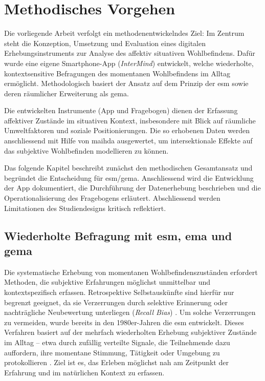 
\section{Methodisches Vorgehen} \label{sec:methodik}

Die vorliegende Arbeit verfolgt ein methodenentwickelndes Ziel: Im Zentrum steht die Konzeption, Umsetzung und Evaluation eines digitalen Erhebungsinstruments zur Analyse des affektiv situativen Wohlbefindens. Dafür wurde eine eigene Smartphone-App (\textit{InterMind}) entwickelt, welche wiederholte, kontextsensitive Befragungen des momentanen Wohlbefindens im Alltag ermöglicht. Methodologisch basiert der Ansatz auf dem Prinzip der \acrfull{esm} sowie deren räumlicher Erweiterung als \acrfull{gema}.

Die entwickelten Instrumente (App und Fragebogen) dienen der Erfassung affektiver Zustände im situativen Kontext, insbesondere mit Blick auf räumliche Umweltfaktoren und soziale Positionierungen. Die so erhobenen Daten werden anschliessend mit Hilfe von \acrfull{maihda} ausgewertet, um intersektionale Effekte auf das subjektive Wohlbefinden modellieren zu können.

Das folgende Kapitel beschreibt zunächst den methodischen Gesamtansatz und begründet die Entscheidung für \acrshort{esm}/\acrshort{gema}. Anschliessend wird die Entwicklung der App dokumentiert, die Durchführung der Datenerhebung beschrieben und die Operationalisierung des Fragebogens erläutert. Abschliessend werden Limitationen des Studiendesigns kritisch reflektiert.


\subsection{Wiederholte Befragung mit \acrshort{esm}, \acrshort{ema} und \acrshort{gema}}

Die systematische Erhebung von momentanen Wohlbefindenszuständen erfordert Methoden, die subjektive Erfahrungen möglichst unmittelbar und kontextspezifisch erfassen. Retrospektive Selbstauskünfte sind hierfür nur begrenzt geeignet, da sie Verzerrungen durch selektive Erinnerung oder nachträgliche Neubewertung unterliegen (\textit{Recall Bias}) \parencite{kahnemanDevelopmentsMeasurementSubjective2006}. Um solche Verzerrungen zu vermeiden, wurde bereits in den 1980er-Jahren die \acrfull{esm} entwickelt. Dieses Verfahren basiert auf der mehrfach wiederholten Erhebung subjektiver Zustände im Alltag – etwa durch zufällig verteilte Signale, die Teilnehmende dazu auffordern, ihre momentane Stimmung, Tätigkeit oder Umgebung zu protokollieren \parencite{csikszentmihalyiValidityReliabilityExperience1987}. Ziel ist es, das Erleben möglichst nah am Zeitpunkt der Erfahrung und im natürlichen Kontext zu erfassen.


